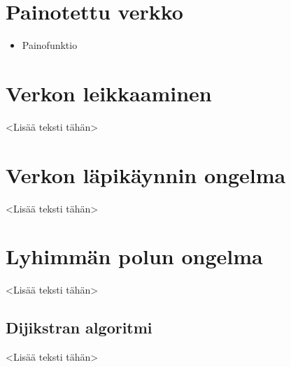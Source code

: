 \section{Painotettu verkko}

\begin{itemize}
  \item Painofunktio
\end{itemize}

\section{Verkon leikkaaminen}

<Lisää teksti tähän>

\section{Verkon läpikäynnin ongelma}

<Lisää teksti tähän>

\section{Lyhimmän polun ongelma}

<Lisää teksti tähän>

  \subsection{Dijikstran algoritmi}

  <Lisää teksti tähän>
